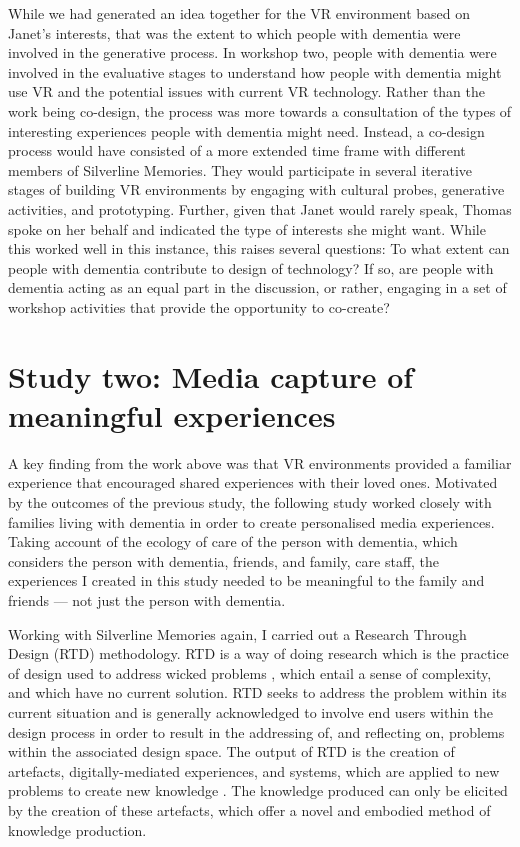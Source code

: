 While we had generated an idea together for the VR environment based on Janet's interests, that was the extent to which people with dementia were involved in the generative process. In workshop two, people with dementia were involved in the evaluative stages to understand how people with dementia might use VR and the potential issues with current VR technology. Rather than the work being co-design, the process was more towards a consultation of the types of interesting experiences people with dementia might need. Instead, a co-design process would have consisted of a more extended time frame with different members of Silverline Memories. They would participate in several iterative stages of building VR environments by engaging with cultural probes, generative activities, and prototyping. Further, given that Janet would rarely speak, Thomas spoke on her behalf and indicated the type of interests she might want. While this worked well in this instance, this raises several questions: To what extent can people with dementia contribute to design of technology? If so, are people with dementia acting as an equal part in the discussion, or rather, engaging in a set of workshop activities that provide the opportunity to co-create? \citep{tsekleves2020engaging,lindsay_empathy_2012}

\section{Study two: Media capture of meaningful experiences}
\label{studyTwo}
A key finding from the work above was that VR environments provided a familiar experience that encouraged shared experiences with their loved ones. Motivated by the outcomes of the previous study, the following study worked closely with families living with dementia in order to create personalised media experiences. Taking account of the ecology of care of the person with dementia, which considers the person with dementia, friends, and family, care staff, the experiences I created in this study needed to be meaningful to the family and friends — not just the person with dementia. 

Working with Silverline Memories again, I carried out a Research Through Design (RTD) methodology. RTD is a way of doing research which is the practice of design used to address wicked problems \citep{zimmerman_research_2007}, which entail a sense of complexity, and which have no current solution. RTD seeks to address the problem within its current situation and is generally acknowledged to involve end users within the design process in order to result in the addressing of, and reflecting on, problems within the associated design space. The output of RTD is the creation of artefacts, digitally-mediated experiences, and systems, which are applied to new problems to create new knowledge \citep{gaver_what_2012,bardzell_documenting_2016}. The knowledge produced can only be elicited by the creation of these artefacts, which offer a novel and embodied method of knowledge production.

